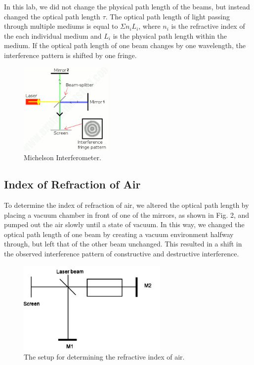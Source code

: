\documentclass{article}
\begin{document}
In this lab, we did not change the physical path length of the beams, but instead changed the optical path length $\tau$. The optical path length of light passing through multiple mediums is equal to $\Sigma n_{i}L_{i}$, where $n_{i}$ is the refractive index of the each individual medium and $L_{i}$ is the physical path length within the medium. If the optical path length of one beam changes by one wavelength, the interference pattern is shifted by one fringe. 
\begin{figure}[htb]
	\begin{center}
		\includegraphics[width=0.40\textwidth]{picture1} %
		\caption{Michelson Interferometer.}
	\end{center}
\end{figure}

\subsection{Index of Refraction of Air}
To determine the index of refraction of air, we altered the optical path length by placing a vacuum chamber in front of one of the mirrors, as shown in Fig. 2, and pumped out the air slowly until a state of vacuum. In this way, we changed the optical path length of one beam by creating a vacuum environment halfway through, but left that of the other beam unchanged. This resulted in a shift in the observed interference pattern of constructive and destructive interference. 

\begin{figure}[htb]
	\begin{center}
		\includegraphics[width=0.65\textwidth]{picture2} %
		\caption{The setup for determining the refractive index of air.}
	\end{center}
\end{figure}
\end{document}
